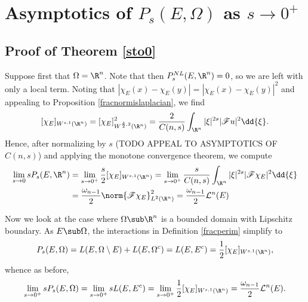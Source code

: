 \documentclass[../main.tex]{subfiles}
\begin{document}
\section{Asymptotics of $ P_{s}(E,\Omega) $ as $ s\to0^{+} $}

\subsection*{Proof of Theorem \ref{sto0}}
    Suppose first that $ \Omega = \R^{n} $. Note that then $ P_{s}^{NL}(E,\R^{n}) = 0 $, so we are left with only a local term. Noting that $ | \chi_{E}(x) - \chi_{E}(y)| = | \chi_{E}(x) - \chi_{E}(y)|^{2} $ and appealing to Proposition \ref{fracnormislaplacian}, we find
    \[
        [\chi_{E}]_{W^{s,1}(\R^{n})} = [ \chi_{E} ]_{W^{\frac{s}{2},2}(\R^{n})}^{2} = \frac{2}{C(n,s)}\int_{\R^{n}}| \xi|^{2s}|\mathscr{F}u|^{2}\dd{\xi}.
    \] 
    Hence, after normalizing by $ s $ (TODO APPEAL TO ASYMPTOTICS OF $C(n,s)$) and applying the monotone convergence theorem, we compute
    \begin{align*}
        \lim_{s\to 0} s P_{s}(E,\R^{n}) &= \lim_{s\to 0^{+}} \frac{s}{2}[ \chi_{E}]_{W^{s,1}(\R^{n})} = \lim_{s\to 0^{+}} \frac{s}{C(n,s)}\int_{\R^{n}}| \xi|^{2s}|\mathscr{F}\chi_{E}|^{2} \dd{\xi} \\
        &= \frac{\omega_{n-1}}{2} \norm{\mathscr{F} \chi_{E}}_{L^{2}(\R^{n})}^{2} = \frac{\omega_{n-1}}{2} \mathcal{L}^{n}(E)
    \end{align*}


    Now we look at the case where $ \Omega\sub \R^{n} $ is a bounded domain with Lipschitz boundary. As $ E\sub \Omega $, the interactions in Definition \ref{fracperim} simplify to 
    \[
        P_{s}(E,\Omega) = L(E, \Omega\setminus E) + L(E, \Omega^{c}) = L(E,E^{c}) = \frac{1}{2}[ \chi_{E}]_{W^{s,1}(\R^{n})},
    \]
    whence as before,
    \[
        \lim_{s\to0^{+}}sP_{s}(E,\Omega) = \lim_{s\to0^{+}} sL(E,E^{c}) = \lim_{s\to0^{+}}\frac{1}{2}[ \chi_{E}]_{W^{s,1}(\R^{n})} = \frac{\omega_{n-1}}{2}\mathcal{L}^{n}(E).
    \]

\end{document}
